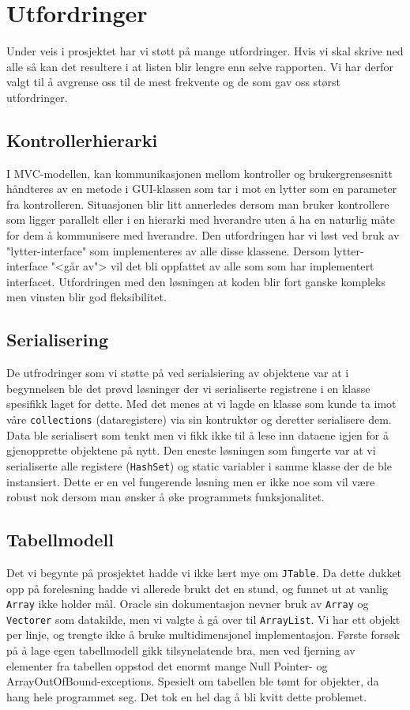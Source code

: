 \section{Utfordringer}
Under veis i prosjektet har vi støtt på mange utfordringer. Hvis vi skal skrive ned alle så kan det resultere i at listen blir lengre enn selve rapporten. Vi har derfor valgt til å avgrense oss til de mest frekvente og de som gav oss størst utfordringer.

\subsection{Kontrollerhierarki}
I MVC-modellen, kan kommunikasjonen mellom kontroller og brukergrensesnitt håndteres av en metode i GUI-klassen som tar i mot en lytter som en parameter fra kontrolleren.
Situasjonen blir litt annerledes dersom man bruker kontrollere som ligger parallelt eller i en hierarki med hverandre uten å ha en naturlig måte for dem å kommunisere med hverandre. Den utfordringen har vi løst ved bruk av "lytter-interface" som implementeres av alle disse klassene. Dersom lytter-interface "<går av"> vil det bli oppfattet av alle som som har implementert interfacet. Utfordringen med den løsningen at koden blir fort ganske kompleks men vinsten blir god fleksibilitet.


\subsection{Serialisering}
De utfrodringer som vi støtte på ved serialsiering av objektene var at i begynnelsen ble det prøvd løsninger der vi serialiserte registrene i en klasse spesifikk laget for dette. 
Med det menes at vi lagde en klasse som kunde ta imot våre \texttt{collections} (dataregistere) via sin kontruktør og deretter serialisere dem. Data ble serialisert som tenkt men vi fikk ikke til å lese inn dataene igjen for å gjenopprette objektene på nytt. Den eneste løsningen som fungerte var at vi serialiserte alle registere (\texttt{HashSet}) og static variabler i samme klasse der de ble instansiert. Dette er en vel fungerende løsning men er ikke noe som vil være robust nok dersom man ønsker å øke programmets funksjonalitet. 


\subsection{Tabellmodell}
Det vi begynte på prosjektet hadde vi ikke lært mye om \texttt{JTable}. Da dette dukket opp på forelesning hadde vi allerede brukt det en stund, og funnet ut at vanlig \texttt{Array} ikke holder mål. Oracle sin dokumentasjon nevner bruk av \texttt{Array} og \texttt{Vectorer} som datakilde, men vi valgte å gå over til \texttt{ArrayList}. Vi har ett objekt per linje, og trengte ikke å bruke multidimensjonel implementasjon.
Første forsøk på å lage egen tabellmodell gikk tilsynelatende bra, men ved fjerning av elementer fra tabellen oppstod det enormt mange Null Pointer- og ArrayOutOfBound-exceptions. Spesielt om tabellen ble tømt for objekter, da hang hele programmet seg. Det tok en hel dag å bli kvitt dette problemet. 

